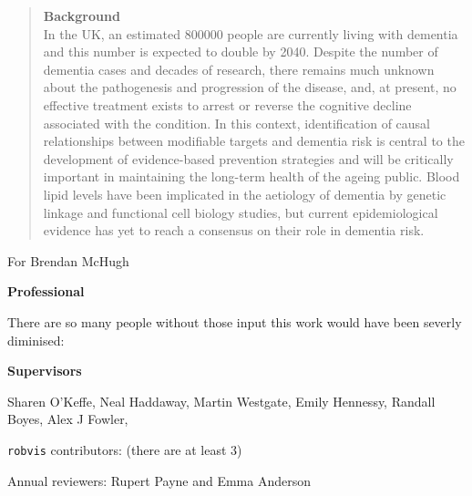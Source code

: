 \documentclass[a4paper, twoside]{templates/ociamthesis}
\begin{document}
\begin{romanpages}

\maketitle

\begin{abstract}
	\textbf{Background}\\
 In the UK, an estimated 800000 people are currently living with dementia and this number is expected to double
 by 2040. Despite the number of dementia cases and decades of research, there remains much unknown about
 the pathogenesis and progression of the disease, and, at present, no effective treatment exists to arrest or
 reverse the cognitive decline associated with the condition. In this context, identification of causal relationships
 between modifiable targets and dementia risk is central to the development of evidence-based prevention
 strategies and will be critically important in maintaining the long-term health of the ageing public. Blood lipid
 levels have been implicated in the aetiology of dementia by genetic linkage and functional cell biology studies,
 but current epidemiological evidence has yet to reach a consensus on their role in dementia risk.
\end{abstract}

\begin{dedication}
  For Brendan McHugh
\end{dedication}

\begin{acknowledgements}
 	\textbf{Professional}

  There are so many people without those input this work would have been severly diminised:

  \textbf{Supervisors}

  Sharen O'Keffe, Neal Haddaway, Martin Westgate, Emily Hennessy, Randall Boyes, Alex J Fowler,

  \texttt{robvis} contributors: (there are at least 3)

  Annual reviewers: Rupert Payne and Emma Anderson


\end{acknowledgements}
\end{romanpages}
\end{document}

